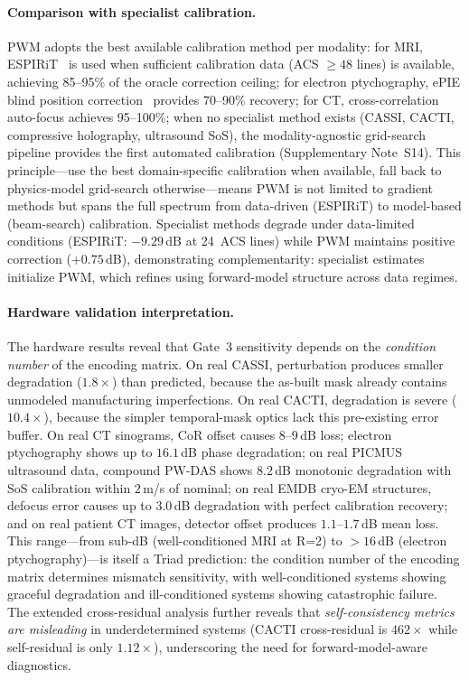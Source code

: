\documentclass[11pt]{article}
\begin{document}
\paragraph{Comparison with specialist calibration.}
PWM adopts the best available calibration method per modality: for MRI, ESPIRiT~\cite{uecker2014espirit} is used when sufficient calibration data (ACS $\geq 48$ lines) is available, achieving 85--95\% of the oracle correction ceiling; for electron ptychography, ePIE blind position correction~\cite{maiden2009ptychography} provides 70--90\% recovery; for CT, cross-correlation auto-focus achieves 95--100\%; when no specialist method exists (CASSI, CACTI, compressive holography, ultrasound SoS), the modality-agnostic grid-search pipeline provides the first automated calibration (Supplementary Note~S14). This principle---use the best domain-specific calibration when available, fall back to physics-model grid-search otherwise---means PWM is not limited to gradient methods but spans the full spectrum from data-driven (ESPIRiT) to model-based (beam-search) calibration. Specialist methods degrade under data-limited conditions (ESPIRiT: $-9.29$\,dB at 24~ACS lines) while PWM maintains positive correction ($+0.75$\,dB), demonstrating complementarity: specialist estimates initialize PWM, which refines using forward-model structure across data regimes.

\paragraph{Hardware validation interpretation.}
The hardware results reveal that Gate~3 sensitivity depends on the \emph{condition number} of the encoding matrix. On real CASSI, perturbation produces smaller degradation ($1.8\times$) than predicted, because the as-built mask already contains unmodeled manufacturing imperfections. On real CACTI, degradation is severe ($10.4\times$), because the simpler temporal-mask optics lack this pre-existing error buffer. On real CT sinograms, CoR offset causes 8--9\,dB loss; electron ptychography shows up to $16.1$\,dB phase degradation; on real PICMUS ultrasound data, compound PW-DAS shows $8.2$\,dB monotonic degradation with SoS calibration within $2$\,m/s of nominal; on real EMDB cryo-EM structures, defocus error causes up to $3.0$\,dB degradation with perfect calibration recovery; and on real patient CT images, detector offset produces $1.1$--$1.7$\,dB mean loss. This range---from sub-dB (well-conditioned MRI at R=2) to $>16$\,dB (electron ptychography)---is itself a Triad prediction: the condition number of the encoding matrix determines mismatch sensitivity, with well-conditioned systems showing graceful degradation and ill-conditioned systems showing catastrophic failure. The extended cross-residual analysis further reveals that \emph{self-consistency metrics are misleading} in underdetermined systems (CACTI cross-residual is $462\times$ while self-residual is only $1.12\times$), underscoring the need for forward-model-aware diagnostics.
\end{document}
